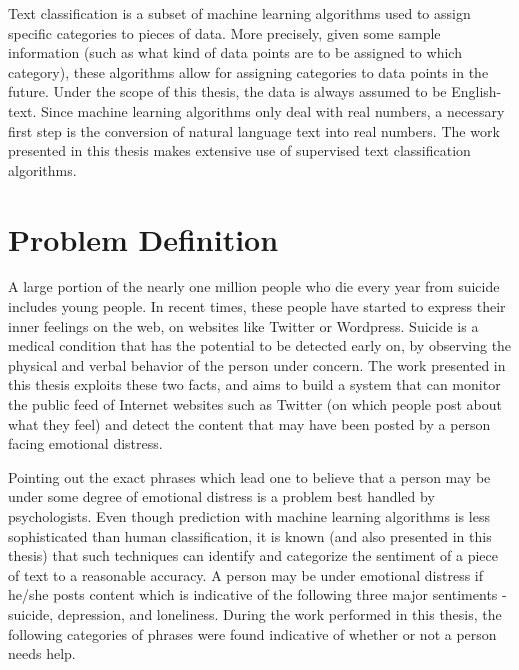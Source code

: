 Text classification is a subset of machine learning algorithms used to assign specific categories to pieces of data. More precisely, given some sample information (such as what kind of data points are to be assigned to which category), these algorithms allow for assigning categories to data points in the future. Under the scope of this thesis, the data is always assumed to be English-text. Since machine learning algorithms only deal with real numbers, a necessary first step is the conversion of natural language text into real numbers. The work presented in this thesis makes extensive use of supervised text classification algorithms.

\section{Problem Definition}
A large portion of the nearly one million people who die every year from suicide includes young people. In recent times, these people have started to express their inner feelings on the web, on websites like Twitter or Wordpress. Suicide is a medical condition that has the potential to be detected early on, by observing the physical and verbal behavior of the person under concern. The work presented in this thesis exploits these two facts, and aims to build a system that can monitor the public feed of Internet websites such as Twitter (on which people post about what they feel) and detect the content that may have been posted by a person facing emotional distress.

Pointing out the exact phrases which lead one to believe that a person may be under some degree of emotional distress is a problem best handled by psychologists. Even though prediction with machine learning algorithms is less sophisticated than human classification, it is known (and also presented in this thesis) that such techniques can identify and categorize the sentiment of a piece of text to a reasonable accuracy. A person may be under emotional distress if he/she posts content which is indicative of the following three major sentiments - suicide, depression, and loneliness. During the work performed in this thesis, the following categories of phrases were found indicative of whether or not a person needs help.

